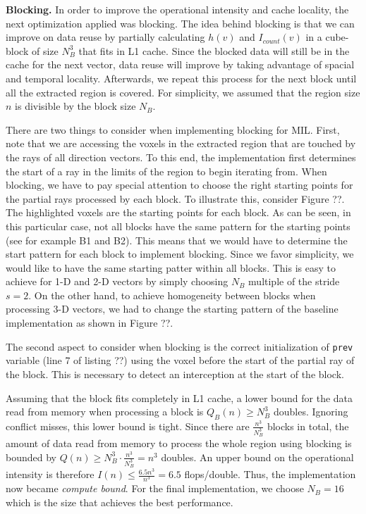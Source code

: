 \documentclass[letterpaper]{article}
\newcommand{\mypar}[1]{{\bf #1.}}
\begin{document}
\mypar{Blocking}
In order to improve the operational intensity and cache locality, the next optimization applied was blocking. The idea behind blocking is that we can improve on data reuse by partially calculating $h(v)$ and $I_{count}(v)$ in a cube-block of size $N_B^3$ that fits in L1 cache. Since the blocked data will still be in the cache for the next vector, data reuse will improve by taking advantage of spacial and temporal locality. Afterwards, we repeat this process for the next block until all the extracted region is covered. For simplicity, we assumed that the region size $n$ is divisible by the block size $N_B$.

There are two things to consider when implementing blocking for MIL. First, note that we are accessing the voxels in the extracted region that are touched by the rays of all direction vectors. To this end, the implementation first determines the start of a ray in the limits of the region to begin iterating from. When blocking, we have to pay special attention to choose the right starting points for the partial rays processed by each block. To illustrate this, consider Figure ??. The highlighted voxels are the starting points for each block. As can be seen, in this particular case, not all blocks have the same pattern for the starting points (see for example B1 and B2). This means that we would have to determine the start pattern for each block to implement blocking. Since we favor simplicity, we would like to have the same starting patter within all blocks. This is easy to achieve for 1-D and 2-D vectors by simply choosing $N_B$ multiple of the stride $s=2$. On the other hand, to achieve homogeneity between blocks when processing 3-D vectors, we had to change the starting pattern of the baseline implementation as shown in Figure ??.

The second aspect to consider when blocking is the correct initialization of \texttt{prev} variable (line 7 of listing ??) using the voxel before the start of the partial ray of the block. This is necessary to detect an interception at the start of the block. 

Assuming that the block fits completely in L1 cache, a lower bound for the data read from memory when processing a block is $Q_B(n) \geq N_B^3$ doubles. Ignoring conflict misses, this lower bound is tight. Since there are $\frac{n^3}{N_B^3}$ blocks in total, the amount of data read from memory to process the whole region using blocking is bounded by $Q(n) \geq N_B^3 \cdot \frac{n^3}{N_B^3} = n^3$ doubles. An upper bound on the operational intensity is therefore $I(n) \leq \frac{6.5n^3}{n^3} = 6.5$ flops/double. Thus, the implementation now became \textit{compute bound}. For the final implementation, we choose $N_B = 16$ which is the size that achieves the best performance.
\end{document}
